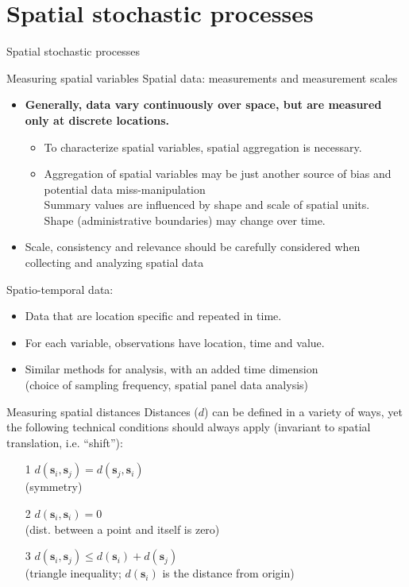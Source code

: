 \documentclass{beamer}
\begin{document}
\section{Spatial stochastic processes}
\begin{frame}{Spatial stochastic processes}
\end{frame}
\begin{frame}{Measuring spatial variables}
Spatial data: measurements and measurement scales
\begin{itemize}
    \item \textbf{Generally, data vary continuously over space, but are measured only at discrete locations.} 
    \begin{itemize}
        \item To characterize spatial variables, spatial aggregation is necessary.
        \item Aggregation of spatial variables may be just another source of bias and potential data miss-manipulation\\ 
        Summary values are influenced by shape and scale of spatial units.\\
        Shape (administrative boundaries) may change over time.
    \end{itemize}
    \item Scale, consistency and relevance should be carefully considered
when collecting and analyzing spatial data
\end{itemize}
\medskip
Spatio-temporal data:
\begin{itemize}
    \item Data that are location specific and repeated in time.
    \item For each variable, observations have location, time and value.
    \item Similar methods for analysis, with an added time dimension \\(choice of sampling frequency, spatial panel data analysis)
\end{itemize}
\end{frame}
\begin{frame}{Measuring spatial distances}
Distances ($d$) can be defined in a variety of ways, yet the following technical conditions should always apply (invariant to spatial translation, i.e. ``shift''):\\
\medskip
\begin{enumerate} 
\item[1] $d(\bm{s}_i, \bm{s}_j) = d(\bm{s}_j, \bm{s}_i)$ \\ \smallskip (symmetry) 
\medskip
\item[2] $d(\bm{s}_i, \bm{s}_i) = 0$  \\ \smallskip (dist. between a point and itself is zero) 
\medskip
\item[3] $d(\bm{s}_i, \bm{s}_j) \leq d(\bm{s}_i) + d(\bm{s}_j)$  \\ \smallskip (triangle inequality; 
$d(\bm{s}_i)$ is the distance from origin) 
\end{enumerate}
\end{frame}
\end{document}
